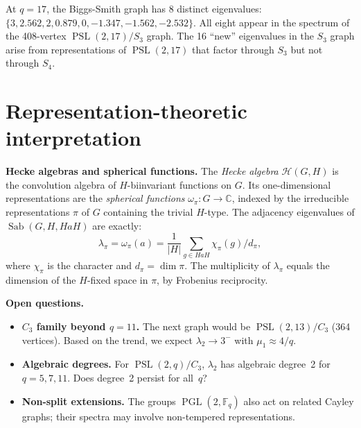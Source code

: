 \documentclass[11pt,a4paper]{article}
\theoremstyle{plain}
\theoremstyle{definition}
\theoremstyle{remark}
\newcommand{\C}{\mathbb{C}}
\newcommand{\F}{\mathbb{F}}
\newcommand{\PSL}{\operatorname{PSL}}
\newcommand{\PGL}{\operatorname{PGL}}
\newcommand{\Sab}{\operatorname{Sab}}
\begin{document}
At $q=17$, the Biggs-Smith graph has 8 distinct eigenvalues:
$\{3, 2.562, 2, 0.879, 0, -1.347, -1.562, -2.532\}$.
All eight appear in the spectrum of the 408-vertex $\PSL(2,17)/S_3$ graph.
The 16 ``new'' eigenvalues in the $S_3$ graph arise from representations
of $\PSL(2,17)$ that factor through $S_3$ but not through $S_4$.


\section{Representation-theoretic interpretation}

\begin{tcolorbox}[breakable, colback=yellow!10, colframe=yellow!10,
  boxrule=0pt, sharp corners]
\textbf{Hecke algebras and spherical functions.}
The \emph{Hecke algebra} $\mathcal{H}(G,H)$ is the convolution algebra of
$H$-biinvariant functions on $G$. Its one-dimensional representations are
the \emph{spherical functions} $\omega_\pi\colon G \to \C$, indexed by the
irreducible representations $\pi$ of $G$ containing the trivial $H$-type.
The adjacency eigenvalues of $\Sab(G,H,HaH)$ are exactly:
\[
  \lambda_\pi = \omega_\pi(a) =
    \frac{1}{|H|} \sum_{g \in HaH} \chi_\pi(g)/d_\pi,
\]
where $\chi_\pi$ is the character and $d_\pi = \dim\pi$.
The multiplicity of $\lambda_\pi$ equals the dimension of the $H$-fixed
space in $\pi$, by Frobenius reciprocity.
\end{tcolorbox}

\begin{tcolorbox}[breakable, colback=blue!5, colframe=blue!5,
  boxrule=0pt, sharp corners]
\textbf{Open questions.}
\begin{itemize}[noitemsep]
\item \textbf{$C_3$ family beyond $q=11$.} The next graph would be
  $\PSL(2,13)/C_3$ (364 vertices). Based on the trend, we expect
  $\lambda_2 \to 3^-$ with $\mu_1 \approx 4/q$.
\item \textbf{Algebraic degrees.} For $\PSL(2,q)/C_3$, $\lambda_2$ has
  algebraic degree~2 for $q = 5, 7, 11$. Does degree~2 persist for all~$q$?
\item \textbf{Non-split extensions.} The groups $\PGL(2,\F_q)$ also act on
  related Cayley graphs; their spectra may involve non-tempered
  representations.
\end{itemize}
\end{tcolorbox}
\end{document}
